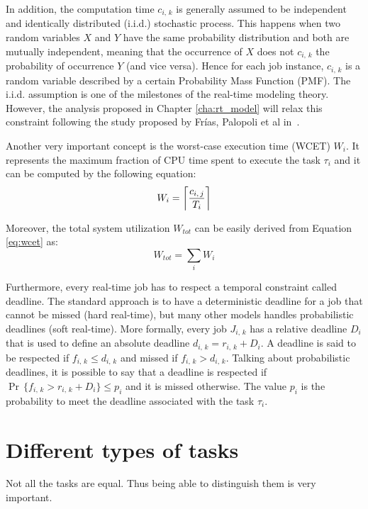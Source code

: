 In addition, the computation time \( c_{i,\,k} \) is generally assumed to be
independent and identically distributed (i.i.d.) stochastic process.
This happens when two random variables \( X \) and \( Y \) have 
the same probability distribution and both are mutually
independent, meaning that the occurrence of \( X \) does not \( c_{i,\,k} \) 
the probability of occurrence \( Y \) (and vice versa).
Hence for each job instance, \( c_{i,\,k} \) is a random
variable described by a certain Probability Mass Function (PMF).
The i.i.d. assumption is one of the milestones of the real-time modeling theory.
However, the analysis proposed in Chapter \ref{cha:rt_model} will relax this 
constraint following the study proposed by Fr\'{i}as, Palopoli et al
in~\cite{frias2017probabilistic}.

Another very important concept is the worst-case execution time (WCET) \( W_{i} \).
It represents the maximum fraction of CPU time spent to execute the task
\( \tau_{i} \) and it can be computed by the following equation:
\begin{equation}\label{eq:wcet}
    W_{i} = \ceil[\bigg]{\frac{c_{i,\,j}}{T_{i}}}
\end{equation}

Moreover, the total system utilization \( W_{tot} \) can be easily derived from
Equation \ref{eq:wcet} as:
\begin{equation}\label{eq:system_utilization}
    W_{tot} = \displaystyle\sum_{i} W_{i}
\end{equation}

Furthermore, every real-time job has to respect a temporal constraint called
deadline. The standard approach is to have a deterministic deadline for a job
that cannot be missed (hard real-time), but many other models handles
probabilistic deadlines (soft real-time).
More formally, every job \( J_{i,\,k} \) has a relative deadline \( D_{i} \) that
is used to define an absolute deadline \( d_{i,\,k} = r_{i,\,k} + D_{i} \).
A deadline is said to be respected if \( f_{i,\,k} \leq d_{i,\,k} \) and missed
if \( f_{i,\,k} > d_{i,\,k} \). Talking about probabilistic deadlines, it is
possible to say that a deadline is respected if 
\( \Pr\,\{f_{i,\,k} > r_{i,\,k} + D_{i} \} \leq p_{i} \) and it is missed otherwise.
The value \( p_{i} \) is the probability to meet the deadline associated
with the task \( \tau_{i} \).


\section{Different types of tasks}
Not all the tasks are equal. Thus being able to distinguish them is
very important.

